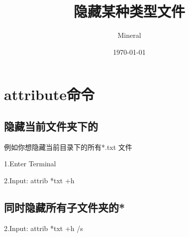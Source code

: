\documentclass[utf8]{ctexart}
\author{Mineral}
\title{隐藏某种类型文件}
\date {\today}
\begin{document}
		\maketitle
		\section{attribute命令}
		\subsection{隐藏当前文件夹下的}
		
		\par 例如你想隐藏当前目录下的所有*.txt 文件
		\par 1.Enter Terminal
		\par 2.Input: 	attrib *txt +h
		\subsection{同时隐藏所有子文件夹的*}
		\par 2.Input: 	attrib *txt +h /s
		
\end{document}
